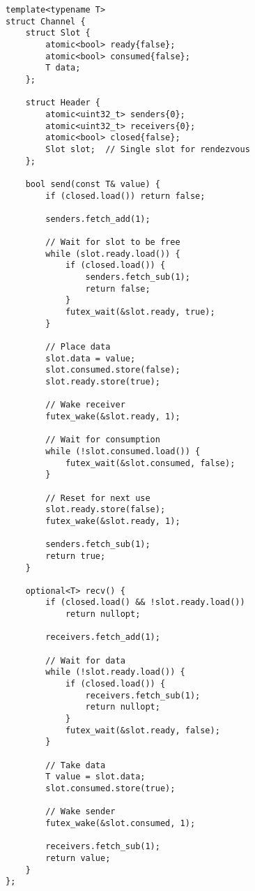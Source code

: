 \documentclass[letterpaper,twocolumn,10pt]{article}
\begin{document}
\begin{lstlisting}[caption={Unbuffered Channel Rendezvous}]
template<typename T>
struct Channel {
    struct Slot {
        atomic<bool> ready{false};
        atomic<bool> consumed{false};
        T data;
    };
    
    struct Header {
        atomic<uint32_t> senders{0};
        atomic<uint32_t> receivers{0};
        atomic<bool> closed{false};
        Slot slot;  // Single slot for rendezvous
    };
    
    bool send(const T& value) {
        if (closed.load()) return false;
        
        senders.fetch_add(1);
        
        // Wait for slot to be free
        while (slot.ready.load()) {
            if (closed.load()) {
                senders.fetch_sub(1);
                return false;
            }
            futex_wait(&slot.ready, true);
        }
        
        // Place data
        slot.data = value;
        slot.consumed.store(false);
        slot.ready.store(true);
        
        // Wake receiver
        futex_wake(&slot.ready, 1);
        
        // Wait for consumption
        while (!slot.consumed.load()) {
            futex_wait(&slot.consumed, false);
        }
        
        // Reset for next use
        slot.ready.store(false);
        futex_wake(&slot.ready, 1);
        
        senders.fetch_sub(1);
        return true;
    }
    
    optional<T> recv() {
        if (closed.load() && !slot.ready.load()) 
            return nullopt;
        
        receivers.fetch_add(1);
        
        // Wait for data
        while (!slot.ready.load()) {
            if (closed.load()) {
                receivers.fetch_sub(1);
                return nullopt;
            }
            futex_wait(&slot.ready, false);
        }
        
        // Take data
        T value = slot.data;
        slot.consumed.store(true);
        
        // Wake sender
        futex_wake(&slot.consumed, 1);
        
        receivers.fetch_sub(1);
        return value;
    }
};
\end{lstlisting}
\end{document}
